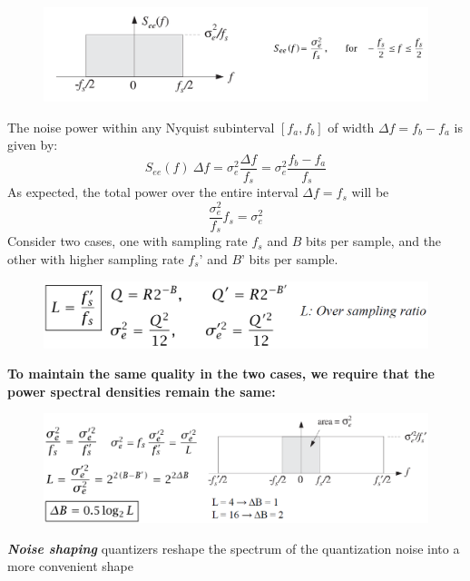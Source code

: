 \begin{figure}[h!]
    \centering
    \includegraphics[width=0.5\linewidth]{img/25.png}
\end{figure}

The noise power within any Nyquist subinterval $[f_a, f_b]$ of width $\Delta f = f_b - f_a$ is given by:
\begin{equation*}
    S_{ee}(f)\ \Delta f = \sigma^2_e \dfrac{\Delta f}{f_s} = \sigma^2_e \dfrac{f_b-f_a}{f_s} 
\end{equation*}
As expected, the total power over the entire interval $\Delta f = f_s$ will be
\begin{equation*}
    \dfrac{\sigma^2_e }{f_s}f_s=\sigma^2_e 
\end{equation*}
Consider two cases, one with sampling rate $f_s$ and $B$ bits per sample, and the other with higher sampling rate $f_s’$ and $B’$ bits per sample.
\begin{figure}[h!]
    \centering
    \includegraphics[width=0.5\linewidth]{img/26.png}
\end{figure}

\textbf{To maintain the same quality in the two cases, we require that the power spectral densities remain the same:}
\begin{figure}[h!]
    \centering
    \includegraphics[width=0.5\linewidth]{img/27.png}
\end{figure}

\textbf{\textit{Noise shaping}} quantizers reshape the spectrum of the quantization noise into a more convenient shape


